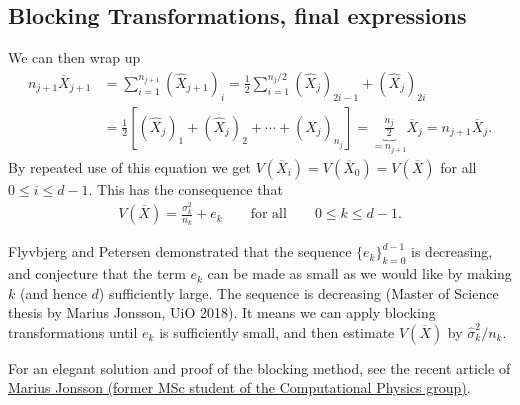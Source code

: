 \documentclass[%
oneside,                 %
final,                   %
10pt]{article}
\begin{document}
\subsection*{Blocking Transformations, final expressions}

We can then wrap up
\begin{align}
n_{j+1} \overline{X}_{j+1}  &= \sum_{i=1}^{n_{j+1}} (\hat{X}_{j+1})_i =  \frac{1}{2}\sum_{i=1}^{n_{j}/2} (\hat{X}_{j})_{2i-1} + (\hat{X}_{j})_{2i} \nonumber \\
&= \frac{1}{2}\left[ (\hat{X}_j)_1 + (\hat{X}_j)_2 + \cdots + (\hat{X}_j)_{n_j} \right] = \underbrace{\frac{n_j}{2}}_{=n_{j+1}} \overline{X}_j = n_{j+1}\overline{X}_j. 
\end{align}
By repeated use of this equation we get $V(\overline{X}_i) = V(\overline{X}_0) = V(\overline{X})$ for all $0 \leq i \leq d-1$. This has the consequence that
\begin{align}
V(\overline{X}) = \frac{\sigma_k^2}{n_k} + e_k \qquad \text{for all} \qquad 0 \leq k \leq d-1. \label{eq:convergence}
\end{align}

Flyvbjerg and Petersen demonstrated that the sequence
$\{e_k\}_{k=0}^{d-1}$ is decreasing, and conjecture that the term
$e_k$ can be made as small as we would like by making $k$ (and hence
$d$) sufficiently large. The sequence is decreasing (Master of Science thesis by Marius Jonsson, UiO 2018).
It means we can apply blocking transformations until
$e_k$ is sufficiently small, and then estimate $V(\overline{X})$ by
$\widehat{\sigma}^2_k/n_k$. 

For an elegant solution and proof of the blocking method, see the recent article of \href{{https://journals.aps.org/pre/abstract/10.1103/PhysRevE.98.043304}}{Marius Jonsson (former MSc student of the Computational Physics group)}.


\end{document}
